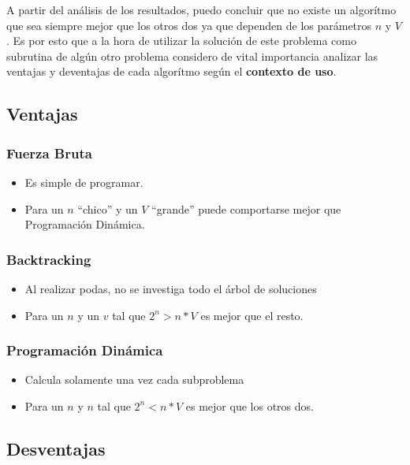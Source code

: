 \par A partir del an\'alisis de los resultados, puedo concluir que no existe un algor\'itmo
que sea siempre mejor que los otros dos ya que dependen de los par\'ametros $n$ y $V$.
Es por esto que a la hora de utilizar la soluci\'on de este problema como subrutina de 
alg\'un otro problema considero de vital importancia analizar las ventajas y deventajas
de cada algor\'itmo seg\'un el \textbf{contexto de uso}.
\subsection{Ventajas}
\subsubsection{Fuerza Bruta}
\begin{itemize}
    \item[\checkmark] Es simple de programar.
    \item[\checkmark] Para un $n$ ``chico'' y un $V$ ``grande'' puede comportarse mejor
    que Programaci\'on Din\'amica.
\end{itemize}

\subsubsection{Backtracking}
\begin{itemize}
    \item[\checkmark] Al realizar podas, no se investiga todo el \'arbol de soluciones
    \item[\checkmark] Para un $n$ y un $v$ tal que $2^n > n*V$ es mejor que el resto.

\end{itemize}

\subsubsection{Programaci\'on Din\'amica}
\begin{itemize}
    \item[\checkmark] Calcula solamente una vez cada subproblema
    \item[\checkmark] Para un $n$ y $n$ tal que $2^n < n*V$ es mejor que los otros dos.

\end{itemize}
\subsection{Desventajas}

